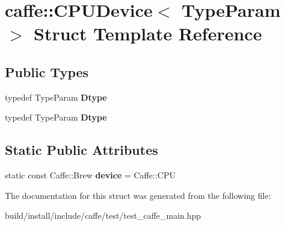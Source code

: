 \hypertarget{structcaffe_1_1_c_p_u_device}{}\section{caffe\+:\+:C\+P\+U\+Device$<$ Type\+Param $>$ Struct Template Reference}
\label{structcaffe_1_1_c_p_u_device}
\subsection*{Public Types}
\begin{DoxyCompactItemize}
\item 
\mbox{\label{structcaffe_1_1_c_p_u_device_a282b14e8c5906630474a14da89a2b212}} 
typedef Type\+Param {\bfseries Dtype}
\item 
\mbox{\label{structcaffe_1_1_c_p_u_device_a282b14e8c5906630474a14da89a2b212}} 
typedef Type\+Param {\bfseries Dtype}
\end{DoxyCompactItemize}
\subsection*{Static Public Attributes}
\begin{DoxyCompactItemize}
\item 
\mbox{\label{structcaffe_1_1_c_p_u_device_a9eb570d24ee7f06a9f7872ef32bf8543}} 
static const Caffe\+::\+Brew {\bfseries device} = Caffe\+::\+C\+PU
\end{DoxyCompactItemize}


The documentation for this struct was generated from the following file\+:\begin{DoxyCompactItemize}
\item 
build/install/include/caffe/test/test\+\_\+caffe\+\_\+main.\+hpp\end{DoxyCompactItemize}
